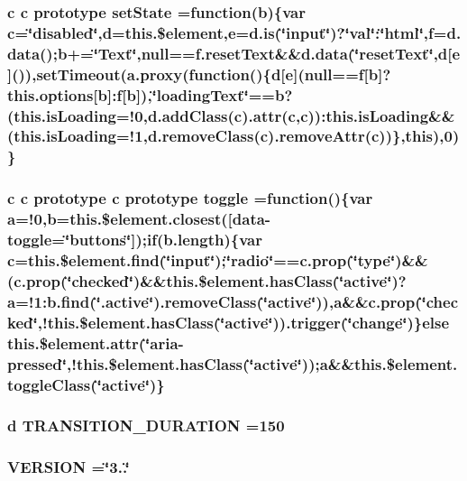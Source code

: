 \subsubsection[{set\+State}]{ {\bf c} {\bf c} prototype set\+State =function({\bf b})\{var {\bf c}=\char`\"{}disabled\char`\"{},d=this.\$element,{\bf e}=d.\+is(\char`\"{}input\char`\"{})?\char`\"{}val\char`\"{}\+:\char`\"{}html\char`\"{},f=d.\+data();{\bf b}+=\char`\"{}Text\char`\"{},null==f.\+reset\+Text\&\&d.\+data(\char`\"{}reset\+Text\char`\"{},d[{\bf e}]()),set\+Timeout(a.\+proxy(function()\{{\bf d}[{\bf e}](null==f[{\bf b}]?this.\+options[{\bf b}]\+:f[{\bf b}]),\char`\"{}loading\+Text\char`\"{}==b?(this.\+is\+Loading=!0,d.\+add\+Class({\bf c}).attr({\bf c},{\bf c}))\+:this.\+is\+Loading\&\&(this.\+is\+Loading=!1,d.\+remove\+Class({\bf c}).remove\+Attr({\bf c}))\},this),0)\}}\label{bootstrap_8min_8js_a14f119ea3b5abc5536d590dfe1793c6e}
\subsubsection[{toggle}]{ {\bf c} {\bf c} prototype {\bf c} prototype toggle =function()\{var {\bf a}=!0,{\bf b}=this.\$element.\+closest(\textquotesingle{}[data-\/toggle=\char`\"{}buttons\char`\"{}]\textquotesingle{});if(b.\+length)\{var {\bf c}=this.\$element.\+find(\char`\"{}input\char`\"{});\char`\"{}radio\char`\"{}==c.\+prop(\char`\"{}type\char`\"{})\&\&(c.\+prop(\char`\"{}checked\char`\"{})\&\&this.\$element.\+has\+Class(\char`\"{}active\char`\"{})?a=!1\+:b.\+find(\char`\"{}.active\char`\"{}).remove\+Class(\char`\"{}active\char`\"{})),a\&\&c.\+prop(\char`\"{}checked\char`\"{},!this.\$element.\+has\+Class(\char`\"{}active\char`\"{})).trigger(\char`\"{}change\char`\"{})\}else this.\$element.\+attr(\char`\"{}aria-\/pressed\char`\"{},!this.\$element.\+has\+Class(\char`\"{}active\char`\"{}));a\&\&this.\$element.\+toggle\+Class(\char`\"{}active\char`\"{})\}}\label{bootstrap_8min_8js_aa8e797a9bda5e7e313be3518054164a3}
\subsubsection[{T\+R\+A\+N\+S\+I\+T\+I\+O\+N\+\_\+\+D\+U\+R\+A\+T\+I\+O\+N}]{ {\bf d} T\+R\+A\+N\+S\+I\+T\+I\+O\+N\+\_\+\+D\+U\+R\+A\+T\+I\+O\+N =150}\label{bootstrap_8min_8js_ae4adb159aeacba734c34bd530baf92f6}
\subsubsection[{V\+E\+R\+S\+I\+O\+N}]{ V\+E\+R\+S\+I\+O\+N =\char`\"{}3..\char`\"{}}\label{bootstrap_8min_8js_a3635f2df5844f69204b70bf7b3983587}
